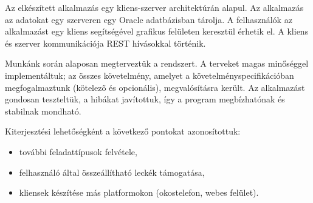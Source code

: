 \documentclass[11pt, a4paper]{article}
\begin{document}
	Az elkészített alkalmazás egy kliens-szerver architektúrán alapul. Az alkalmazás az adatokat egy szerveren egy Oracle
	adatbázisban tárolja. A felhasználók az alkalmazást egy kliens segítségével grafikus felületen keresztül érhetik el. A kliens és szerver kommunikációja REST hívásokkal történik. 
	
	Munkánk során alaposan megterveztük a rendszert. A terveket magas minőséggel implementáltuk; az összes követelmény, amelyet a követelményspecifikációban megfogalmaztunk (kötelező és opcionális), megvalósításra került. Az alkalmazást gondosan teszteltük, a hibákat javítottuk, így a program megbízhatónak és stabilnak mondható.
	
	Kiterjesztési lehetőségként a következő pontokat azonosítottuk:
	\begin{itemize}
		\item további feladattípusok felvétele,
		\item felhasználó által összeállítható leckék támogatása,
		\item kliensek készítése más platformokon (okostelefon, webes felület).
	\end{itemize}
\end{document}
